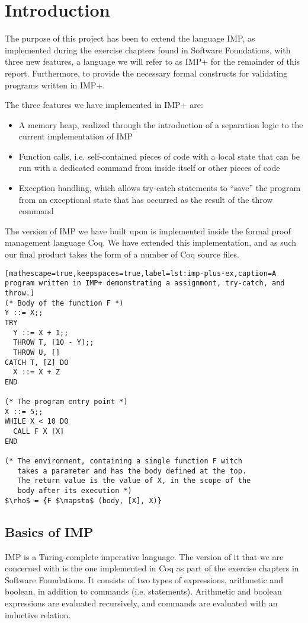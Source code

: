 
\section{Introduction}
The purpose of this project has been to extend the language IMP, as implemented during the exercise chapters found in Software Foundations, with three new features, a language we will refer to as IMP+ for the remainder of this report. Furthermore, to provide the necessary formal constructs for validating programs written in IMP+.

The three features we have implemented in IMP+ are:
\begin{itemize}
\item A memory heap, realized through the introduction of a separation logic to the current implementation of IMP
\item Function calls, i.e. self-contained pieces of code with a local state that can be run with a dedicated command from inside itself or other pieces of code
\item Exception handling, which allows try-catch statements to “save” the program from an exceptional state that has occurred as the result of the throw command
\end{itemize}

The version of IMP we have built upon is implemented inside the formal proof management language Coq. We have extended this implementation, and as such our final product takes the form of a number of Coq source files.

\begin{lstlisting}[mathescape=true,keepspaces=true,label=lst:imp-plus-ex,caption=A program written in IMP+ demonstrating a assignmont, try-catch, and throw.]
(* Body of the function F *)
Y ::= X;;
TRY
  Y ::= X + 1;;
  THROW T, [10 - Y];;
  THROW U, []
CATCH T, [Z] DO
  X ::= X + Z
END

(* The program entry point *)
X ::= 5;;
WHILE X < 10 DO
  CALL F X [X]
END

(* The environment, containing a single function F witch
   takes a parameter and has the body defined at the top.
   The return value is the value of X, in the scope of the 
   body after its execution *)
$\rho$ = {F $\mapsto$ (body, [X], X)}
\end{lstlisting}

\subsection{Basics of IMP}
IMP is a Turing-complete imperative language. The version of it that we are concerned with is the one implemented in Coq as part of the exercise chapters in Software Foundations. It consists of two types of expressions, arithmetic and boolean, in addition to commands (i.e. statements). Arithmetic and boolean expressions are evaluated recursively, and commands are evaluated with an inductive relation.

